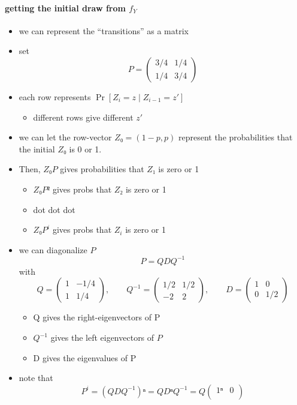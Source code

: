 \paragraph{getting the initial draw from $f_Y$}
\begin{itemize}
\item we can represent the ``transitions'' as a matrix
\item set \[P = \begin{pmatrix} 3/4 & 1/4 \\ 1/4 & 3/4 \end{pmatrix}\]
\item each row represents $\Pr[Z_i = z ∣ Z_{i-1} = z']$
\begin{itemize}
\item different rows give different $z'$
\end{itemize}
\item we can let the row-vector $Z₀ = (1-p, p)$ represent the
  probabilities that the initial $Z₀$ is 0 or 1.
\item Then, $Z₀ P$ gives probabilities that $Z₁$ is zero or 1
\begin{itemize}
\item $Z₀ P²$ gives probs that $Z₂$ is zero or 1
\item dot dot dot
\item $Z₀ P^i$ gives probs that $Z_i$ is zero or 1
\end{itemize}
\item we can diagonalize $P$
        \[P = Q D Q^{-1}\]
        with
        \[Q = \begin{pmatrix} 1 & -1/4 \\ 1 &
        1/4 \end{pmatrix},\qquad 
        Q^{-1} = \begin{pmatrix} 1/2 & 1/2 \\ -2 & 2 \end{pmatrix},
        \qquad 
        D = \begin{pmatrix} 1 & 0 \\ 0 & 1/2 \end{pmatrix}\]
\begin{itemize}
\item Q gives the right-eigenvectors of P
\item $Q^{-1}$ gives the left eigenvectors of $P$
\item D gives the eigenvalues of P
\end{itemize}
\item note that 
  \[P^i = (Q D Q^{-1})ⁿ = Q Dⁿ Q^{-1} = Q \begin{pmatrix} 1ⁿ & 0 \\

\end{pmatrix}\]
\end{itemize}
